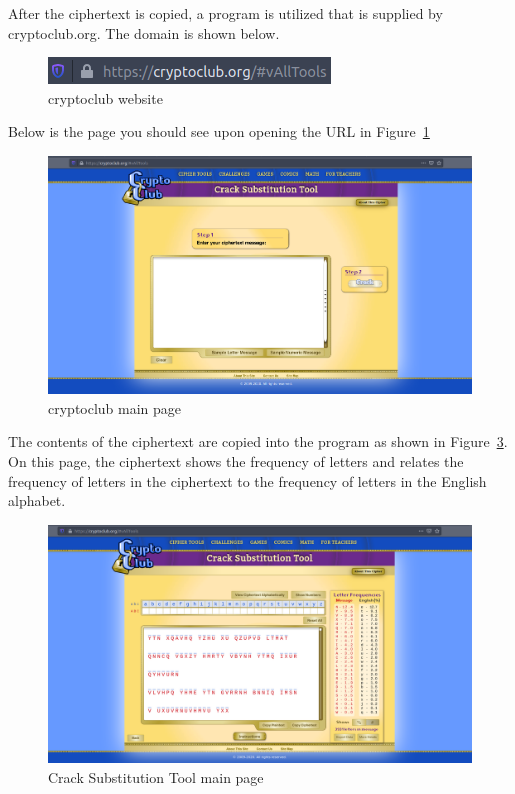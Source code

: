 \documentclass[12pt]{article}
\begin{document}
After the ciphertext is copied, a program is utilized that is supplied by cryptoclub.org. The domain is shown below.

\begin{figure}[!ht]
    \begin{center}
        \includegraphics[scale=0.65]{c0.1.png}
    \end{center}{}
    \caption{cryptoclub website}
    \label{fig:c0.1}
\end{figure}

\clearpage

Below is the page you should see upon opening the URL in Figure~\ref{fig:c0.1}

\begin{figure}[!ht]
    \begin{center}
        \includegraphics[scale=0.3]{c1.png}
    \end{center}{}
    \caption{cryptoclub main page}
    \label{fig:c1}
\end{figure}


The contents of the ciphertext are copied into the program as shown in Figure~\ref{fig:c3}. On this page, the ciphertext shows the frequency of letters and relates the frequency of letters in the ciphertext to the frequency of letters in the English alphabet.


\begin{figure}[!ht]
    \begin{center}
        \includegraphics[scale=0.3]{c3.png}
    \end{center}{}
    \caption{Crack Substitution Tool main page}
    \label{fig:c3}
\end{figure}
\end{document}

